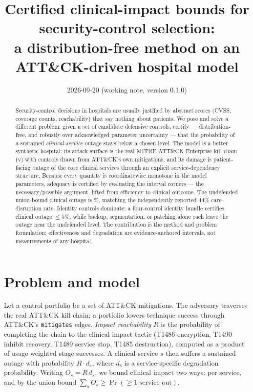 \documentclass[11pt]{article}
\title{Certified clinical-impact bounds for security-control selection:\\
a distribution-free method on an ATT\&CK-driven hospital model}
\author{}
\date{2026-09-20 (working note, version 0.1.0)}
\begin{document}
\maketitle

\begin{abstract}
Security-control decisions in hospitals are usually justified by abstract scores
(CVSS, coverage counts, reachability) that say nothing about patients. We pose and
solve a different problem: given a set of candidate defensive controls, certify ---
distribution-free, and robustly over acknowledged parameter uncertainty --- that
the probability of a sustained \emph{clinical-service} outage stays below a chosen
level. The model is a better synthetic hospital: its attack surface is the real
MITRE ATT\&CK Enterprise kill chain (v\ClinAttackVersion) with controls drawn from
ATT\&CK's own mitigations, and its damage is patient-facing outage of the
\ClinServices{} core clinical services through an explicit service-dependency
structure. Because every quantity is coordinatewise monotone in the model
parameters, adequacy is certified by evaluating the interval corners --- the
necessary/possible argument, lifted from efficiency to clinical outcome. The
undefended union-bound clinical outage is \ClinEmptyUnionPct\%, matching the
independently reported 44\% care-disruption rate. Identity controls dominate: a
four-control identity bundle certifies clinical outage $\le 5\%$, while backup,
segmentation, or patching alone each leave the outage near the undefended level.
The contribution is the method and problem formulation; effectiveness and
degradation are evidence-anchored intervals, not measurements of any hospital.
\end{abstract}

\section{Problem and model}
Let a control portfolio be a set of ATT\&CK mitigations. The adversary traverses
the real ATT\&CK kill chain; a portfolio lowers technique success through ATT\&CK's
\texttt{mitigates} edges. \emph{Impact reachability} $R$ is the probability of
completing the chain to the clinical-impact tactic (T1486 encryption, T1490 inhibit
recovery, T1489 service stop, T1485 destruction), computed as a product of
usage-weighted stage successes. A clinical service $s$ then suffers a sustained
outage with probability $R\cdot d_s$, where $d_s$ is a service-specific degradation
probability. Writing $O_s=R\,d_s$, we bound clinical impact two ways: per service,
and by the union bound $\sum_s O_s\ge \Pr(\ge 1\text{ service out})$.
\end{document}
